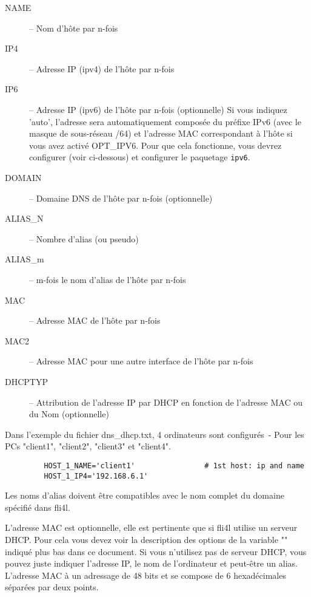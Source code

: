 \begin{description}
{    \begin{description}
      \item[NAME]         -- Nom d'hôte par n-fois
      \item[IP4]          -- Adresse IP (ipv4) de l'hôte par n-fois
      \item[IP6]          -- Adresse IP (ipv6) de l'hôte par n-fois (optionnelle)
                             Si vous indiquez 'auto', l'adresse sera automatiquement
                             composée du préfixe IPv6 (avec le masque de
                             sous-réseau /64) et l'adresse MAC correspondant
                             à l'hôte si vous avez activé OPT\_IPV6. Pour que
                             cela fonctionne, vous devrez configurer
                              (voir ci-dessous) et configurer
                             le paquetage \texttt{ipv6}.
      \item[DOMAIN]       -- Domaine DNS de l'hôte par n-fois (optionnelle)
      \item[ALIAS\_N]     -- Nombre d'alias (ou pseudo)
      \item[ALIAS\_m]     -- m-fois le nom d'alias de l'hôte par n-fois
      \item[MAC]          -- Adresse MAC de l'hôte par n-fois
      \item[MAC2]         -- Adresse MAC pour une autre interface de l'hôte par n-fois
      \item[DHCPTYP]      -- Attribution de l'adresse IP par DHCP en fonction
                            de l'adresse MAC ou du Nom (optionnelle)
    \end{description}

      Dans l'exemple du fichier dns\_dhcp.txt, 4 ordinateurs sont configurés~-
      Pour les PCs "client1", "client2", "client3" et "client4".

\begin{example}
\begin{verbatim}
         HOST_1_NAME='client1'                # 1st host: ip and name
         HOST_1_IP4='192.168.6.1'
\end{verbatim}
\end{example}

      Les noms d'alias doivent être compatibles avec le nom complet du domaine
      spécifié dans fli4l.

      L'adresse MAC est optionnelle, elle est pertinente que si fli4l utilise
      un serveur DHCP. Pour cela vous devez voir la description des options
      de la variable "" indiqué plus bas dans ce document. Si
      vous n'utilisez pas de serveur DHCP, vous pouvez juste indiquer l'adresse IP,
      le nom de l'ordinateur et peut-être un alias. L'adresse MAC à un adressage
      de 48 bits et se compose de 6 hexadécimales séparées par deux points.

}
\end{description}
